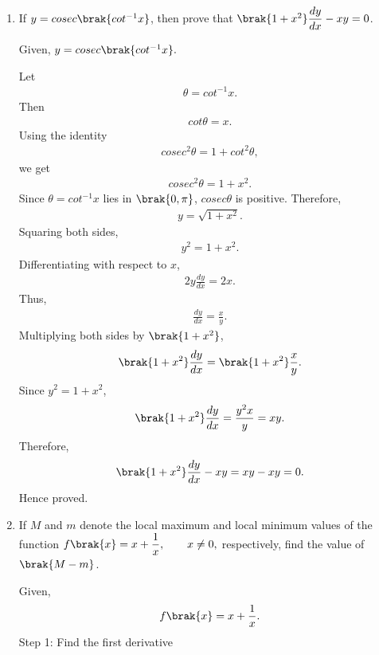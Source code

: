 \begin{enumerate}[label=\thesubsection.\arabic*, ref=\thesubsection.\theenumi]
\begin{align}
f'\left(\frac{\pi}{3}\right)=-8
\end{align}

\item
If $y = cosec \brak{ cot^{-1}x}$, then prove that $\brak{1+x^2}\dfrac{dy}{dx}-xy=0$.

\solution
Given, $y=cosec\brak{cot^{-1}x}.$

Let
\begin{align}
\theta=cot^{-1}x.
\end{align}
Then
\begin{align}
cot\theta=x.
\end{align}
Using the identity
\begin{align}
cosec^2 \theta=1+cot^2 \theta,
\end{align}
we get
\begin{align}
cosec^2\theta=1+x^2.
\end{align}
Since $\theta = cot^{-1}x$ lies in $\brak{0,\pi}$,
$ cosec \theta $ is positive. Therefore,
\begin{align}
y=\sqrt{1+x^2}.
\end{align}
Squaring both sides,
\begin{align}
y^2=1+x^2.
\end{align}
Differentiating with respect to $x$,
\begin{align}
2y\frac{dy}{dx}=2x.
\end{align}
Thus,
\begin{align}
\frac{dy}{dx}=\frac{x}{y}.
\end{align}
Multiplying both sides by $\brak{1+x^2}$,
\begin{align}
\brak{1+x^2}\frac{dy}{dx}
=\brak{1+x^2}\frac{x}{y}.
\end{align}
Since $y^2=1+x^2$,
\begin{align}
\brak{1+x^2}\frac{dy}{dx}
=\frac{y^2x}{y}=xy.
\end{align}
Therefore,
\begin{align}
\brak{1+x^2}\frac{dy}{dx}-xy=xy-xy=0.
\end{align}
Hence proved.



\item
If $M$ and $m$ denote the local maximum and local minimum
values of the function $f\brak{x}=x+\dfrac{1}{x}, \qquad x\ne 0,$
respectively, find the value of $\brak{M-m}$.

\solution
Given,
\begin{align}
f\brak{x}=x+\frac{1}{x}.
\end{align}
{Step 1: Find the first derivative}


\end{enumerate}
